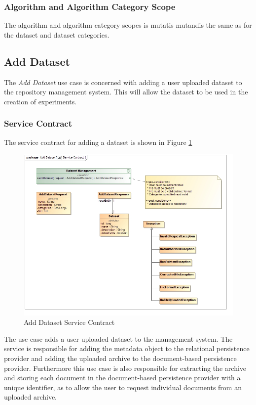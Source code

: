 \subsubsection{Algorithm and Algorithm Category Scope}
The algorithm and algorithm category scopes is mutatis mutandis the same as for
the dataset and dataset categories.



\subsection {Add Dataset}
The \textit{Add Dataset} use case is concerned with adding a user uploaded
dataset to the repository management system. This will allow the dataset to be
used in the creation of experiments.

\subsubsection{Service Contract}
The service contract for adding a dataset is shown in Figure \ref{fig:addDatasetService}
\begin{figure}[H]
  \begin{center}
  \includegraphics[scale=0.38]{../Diagrams and Charts/Repository Management/Add Dataset Service Contract.jpg}
  \caption{Add Dataset Service Contract}
  \label{fig:addDatasetService}
  \end{center}  
\end{figure}

The use case adds a user uploaded dataset to the management system. The
service is responsible for adding the metadata object to the relational
persistence provider and adding the uploaded archive to the document-based
persistence provider. Furthermore this use case is also responsible for
extracting the archive and storing each document in the document-based
persistence provider with a unique identifier, as to allow the user to request
individual documents from an uploaded archive.

